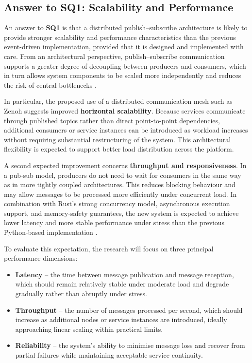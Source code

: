 \documentclass[11pt]{article}
\begin{document}
\subsection{Answer to SQ1: Scalability and Performance}

An answer to \textbf{SQ1} is that a distributed publish--subscribe architecture is likely to provide stronger scalability and performance characteristics than the previous event-driven implementation, provided that it is designed and implemented with care. From an architectural perspective, publish--subscribe communication supports a greater degree of decoupling between producers and consumers, which in turn allows system components to be scaled more independently and reduces the risk of central bottlenecks \cite{eugster2003}.

In particular, the proposed use of a distributed communication mesh such as Zenoh suggests improved \textbf{horizontal scalability}. Because services communicate through published topics rather than direct point-to-point dependencies, additional consumers or service instances can be introduced as workload increases without requiring substantial restructuring of the system. This architectural flexibility is expected to support better load distribution across the platform.

A second expected improvement concerns \textbf{throughput and responsiveness}. In a pub-sub model, producers do not need to wait for consumers in the same way as in more tightly coupled architectures. This reduces blocking behaviour and may allow messages to be processed more efficiently under concurrent load. In combination with Rust's strong concurrency model, asynchronous execution support, and memory-safety guarantees, the new system is expected to achieve lower latency and more stable performance under stress than the previous Python-based implementation \cite{eugster2003}.

To evaluate this expectation, the research will focus on three principal performance dimensions:

\begin{itemize}
    \item \textbf{Latency} -- the time between message publication and message reception, which should remain relatively stable under moderate load and degrade gradually rather than abruptly under stress.
    \item \textbf{Throughput} -- the number of messages processed per second, which should increase as additional nodes or service instances are introduced, ideally approaching linear scaling within practical limits.
    \item \textbf{Reliability} -- the system's ability to minimise message loss and recover from partial failures while maintaining acceptable service continuity.
\end{itemize}
\end{document}
